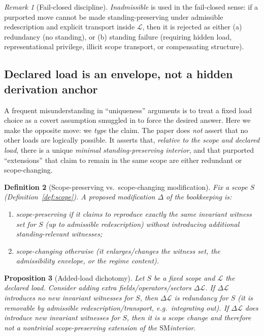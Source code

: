 \documentclass[11pt]{article}
\newtheorem{definition}{Definition}[section]
\newtheorem{proposition}[definition]{Proposition}
\theoremstyle{remark}
\newtheorem{remark}[definition]{Remark}
\newcommand{\SM}{\ensuremath{\mathrm{SM}}}
\newcommand{\Load}{\mathcal{L}}
\begin{document}
\begin{remark}[Fail-closed discipline]\label{rem:fail-closed}
\emph{Inadmissible} is used in the fail-closed sense: if a purported move cannot be made
standing-preserving under admissible redescription and explicit transport inside $\Load$, then it is
rejected as either (a) redundancy (no standing), or (b) standing failure (requiring hidden load,
representational privilege, illicit scope transport, or compensating structure).
\end{remark}



\subsection{Declared load is an envelope, not a hidden derivation anchor}\label{sec:load-envelope}
A frequent misunderstanding in ``uniqueness'' arguments is to treat a fixed load choice as a covert
assumption smuggled in to force the desired answer. Here we make the opposite move: we \emph{type} the
claim. The paper does \emph{not} assert that no other loads are logically possible. It asserts that,
\emph{relative to the scope and declared load}, there is a unique \emph{minimal standing-preserving
interior}, and that purported ``extensions'' that claim to remain in the same scope are either
redundant or scope-changing.

\begin{definition}[Scope-preserving vs.\ scope-changing modification]\label{def:scope-preserving}
Fix a scope $S$ (Definition~\ref{def:scope}).
A proposed modification $\Delta$ of the bookkeeping is:
\begin{enumerate}[label=(\roman*),leftmargin=2.2em]
\item \emph{scope-preserving} if it claims to reproduce exactly the same invariant witness set for $S$
(up to admissible redescription) without introducing additional standing-relevant witnesses;
\item \emph{scope-changing} otherwise (it enlarges/changes the witness set, the admissibility envelope,
or the regime content).
\end{enumerate}
\end{definition}

\begin{proposition}[Added-load dichotomy]\label{prop:added-load}
Let $S$ be a fixed scope and $\Load$ the declared load.
Consider adding extra fields/operators/sectors $\Delta\Load$.
If $\Delta\Load$ introduces \emph{no} new invariant witnesses for $S$, then $\Delta\Load$ is redundancy
for $S$ (it is removable by admissible redescription/transport, e.g.\ integrating out).
If $\Delta\Load$ \emph{does} introduce new invariant witnesses for $S$, then it is a scope change and
therefore not a nontrivial \emph{scope-preserving} extension of the \SM interior.
\end{proposition}
\end{document}
